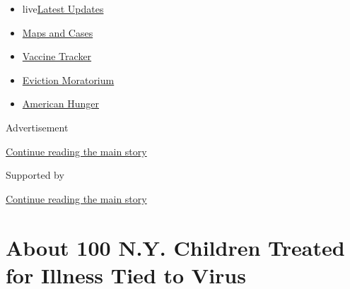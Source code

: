 \begin{itemize}
\tightlist
\item
  live\href{https://www.nytimes3xbfgragh.onion/2020/09/08/world/covid-19-coronavirus.html?name=styln-coronavirus-national\&region=TOP_BANNER\&block=storyline_menu_recirc\&action=click\&pgtype=Article\&impression_id=66c6f1a1-f1da-11ea-8359-5d2adecad97a\&variant=undefined}{Latest
  Updates}
\item
  \href{https://www.nytimes3xbfgragh.onion/interactive/2020/us/coronavirus-us-cases.html?name=styln-coronavirus-national\&region=TOP_BANNER\&block=storyline_menu_recirc\&action=click\&pgtype=Article\&impression_id=66c6f1a2-f1da-11ea-8359-5d2adecad97a\&variant=undefined}{Maps
  and Cases}
\item
  \href{https://www.nytimes3xbfgragh.onion/interactive/2020/science/coronavirus-vaccine-tracker.html?name=styln-coronavirus-national\&region=TOP_BANNER\&block=storyline_menu_recirc\&action=click\&pgtype=Article\&impression_id=66c718b0-f1da-11ea-8359-5d2adecad97a\&variant=undefined}{Vaccine
  Tracker}
\item
  \href{https://www.nytimes3xbfgragh.onion/2020/09/02/your-money/eviction-moratorium-covid.html?name=styln-coronavirus-national\&region=TOP_BANNER\&block=storyline_menu_recirc\&action=click\&pgtype=Article\&impression_id=66c718b1-f1da-11ea-8359-5d2adecad97a\&variant=undefined}{Eviction
  Moratorium}
\item
  \href{https://www.nytimes3xbfgragh.onion/interactive/2020/09/02/magazine/food-insecurity-hunger-us.html?name=styln-coronavirus-national\&region=TOP_BANNER\&block=storyline_menu_recirc\&action=click\&pgtype=Article\&impression_id=66c718b2-f1da-11ea-8359-5d2adecad97a\&variant=undefined}{American
  Hunger}
\end{itemize}

Advertisement

\protect\hyperlink{after-top}{Continue reading the main story}

Supported by

\protect\hyperlink{after-sponsor}{Continue reading the main story}

\hypertarget{about-100-ny-children-treated-for-illness-tied-to-virus}{%
\section{About 100 N.Y. Children Treated for Illness Tied to
Virus}\label{about-100-ny-children-treated-for-illness-tied-to-virus}}

